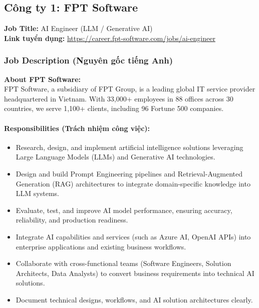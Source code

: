 \subsection{Công ty 1: FPT Software}

\noindent\textbf{Job Title:} AI Engineer (LLM / Generative AI) \\
\textbf{Link tuyển dụng:} \url{https://career.fpt-software.com/jobs/ai-engineer}

\subsubsection*{Job Description (Nguyên gốc tiếng Anh)}

\textbf{About FPT Software:} \\
\indent FPT Software, a subsidiary of FPT Group, is a leading global IT service provider headquartered in Vietnam. With 33,000+ employees in 88 offices across 30 countries, we serve 1,100+ clients, including 96 Fortune 500 companies.

\paragraph{Responsibilities (Trách nhiệm công việc):}
\begin{itemize}
    \item Research, design, and implement artificial intelligence solutions leveraging Large Language Models (LLMs) and Generative AI technologies.
    \item Design and build Prompt Engineering pipelines and Retrieval-Augmented Generation (RAG) architectures to integrate domain-specific knowledge into LLM systems.
    \item Evaluate, test, and improve AI model performance, ensuring accuracy, reliability, and production readiness.
    \item Integrate AI capabilities and services (such as Azure AI, OpenAI APIs) into enterprise applications and existing business workflows.
    \item Collaborate with cross-functional teams (Software Engineers, Solution Architects, Data Analysts) to convert business requirements into technical AI solutions.
    \item Document technical designs, workflows, and AI solution architectures clearly.
\end{itemize}

